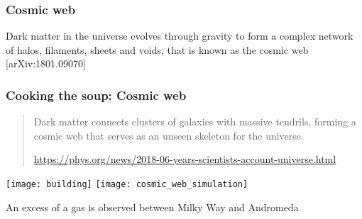 \begin{frame}
  \frametitle{Cosmic web}

      Dark matter in the universe evolves through gravity to form a complex network
of halos, filaments, sheets and voids, that is known as the cosmic web [arXiv:1801.09070]



\end{frame}


\begin{frame}
  \frametitle{Cooking the soup: Cosmic web}
  \begin{quote}
    Dark matter connects clusters of galaxies with massive tendrils, forming a cosmic web that serves as an unseen skeleton for the universe.

     {\tiny \url{https://phys.org/news/2018-06-years-scientists-account-universe.html}} 
  \end{quote}


\texttt{[image: building]} \hspace{2cm}\texttt{[image: cosmic\_web\_simulation]}


  \begin{block}{An excess of a gas is observed between Milky Way and Andromeda}
  \end{block}
\end{frame}


